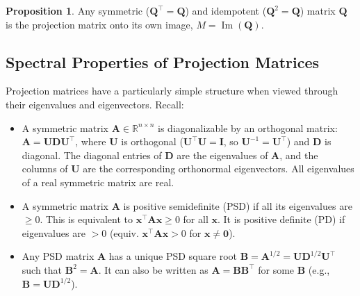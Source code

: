 \documentclass[11pt, letterpaper]{article}
\theoremstyle{definition}
\newtheorem{proposition}{Proposition}[section]
\newcommand{\R}{\mathbb{R}}
\newcommand{\mat}[1]{\mathbf{#1}} %
\newcommand{\vect}[1]{\mathbf{#1}} %
\DeclareMathOperator{\im}{Im}       %
\begin{document}
\begin{proposition}
Any symmetric ($\mat{Q}^{\top}=\mat{Q}$) and idempotent ($\mat{Q}^2 = \mat{Q}$) matrix $\mat{Q}$ is the projection matrix onto its own image, $M = \im(\mat{Q})$.
\end{proposition}

\subsection{Spectral Properties of Projection Matrices}

Projection matrices have a particularly simple structure when viewed through their eigenvalues and eigenvectors. Recall:
\begin{itemize}
    \item A symmetric matrix $\mat{A} \in \R^{n \times n}$ is diagonalizable by an orthogonal matrix: $\mat{A} = \mat{U}\mat{D}\mat{U}^{\top}$, where $\mat{U}$ is orthogonal ($\mat{U}^{\top}\mat{U}=\mat{I}$, so $\mat{U}^{-1}=\mat{U}^{\top}$) and $\mat{D}$ is diagonal. The diagonal entries of $\mat{D}$ are the eigenvalues of $\mat{A}$, and the columns of $\mat{U}$ are the corresponding orthonormal eigenvectors. All eigenvalues of a real symmetric matrix are real.
    \item A symmetric matrix $\mat{A}$ is positive semidefinite (PSD) if all its eigenvalues are $\ge 0$. This is equivalent to $\vect{x}^{\top}\mat{A}\vect{x} \ge 0$ for all $\vect{x}$. It is positive definite (PD) if eigenvalues are $> 0$ (equiv. $\vect{x}^{\top}\mat{A}\vect{x} > 0$ for $\vect{x} \ne \vect{0}$).
    \item Any PSD matrix $\mat{A}$ has a unique PSD square root $\mat{B} = \mat{A}^{1/2} = \mat{U}\mat{D}^{1/2}\mat{U}^{\top}$ such that $\mat{B}^2 = \mat{A}$. It can also be written as $\mat{A}=\mat{B}\mat{B}^{\top}$ for some $\mat{B}$ (e.g., $\mat{B}=\mat{U}\mat{D}^{1/2}$).
\end{itemize}
\end{document}
